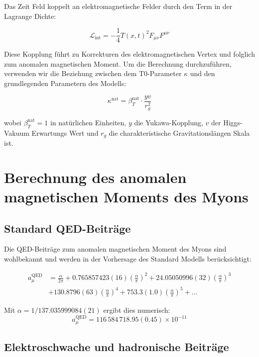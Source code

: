 \documentclass[12pt,a4paper]{article}
\begin{document}
	Das Zeit Feld koppelt an elektromagnetische Felder durch den Term in der Lagrange Dichte:
	
	\begin{equation}
		\mathcal{L}_{\text{int}} = -\frac{1}{4}T(x,t)^2 F_{\mu\nu}F^{\mu\nu}
	\end{equation}
	
	Diese Kopplung führt zu Korrekturen des elektromagnetischen Vertex und folglich zum anomalen magnetischen Moment. Um die Berechnung durchzuführen, verwenden wir die Beziehung zwischen dem T0-Parameter $\kappa$ und den grundlegenden Parametern des Modells:
	
	\begin{equation}
		\kappa^{\text{nat}} = \beta_T^{\text{nat}} \cdot \frac{yv}{r_g^2}
	\end{equation}
	
	wobei $\beta_T^{\text{nat}} = 1$ in natürlichen Einheiten, $y$ die Yukawa-Kopplung, $v$ der Higgs-Vakuum Erwartungs Wert und $r_g$ die charakteristische Gravitationslängen Skala ist.
	
	\section{Berechnung des anomalen magnetischen Moments des Myons}
	
	\subsection{Standard QED-Beiträge}
	
	Die QED-Beiträge zum anomalen magnetischen Moment des Myons sind wohlbekannt und werden in der Vorhersage des Standard Modells berücksichtigt:
	
	\begin{align}
		a_\mu^{\text{QED}} &= \frac{\alpha}{2\pi} + 0.765857423(16) \left(\frac{\alpha}{\pi}\right)^2 + 24.05050996(32) \left(\frac{\alpha}{\pi}\right)^3 \nonumber\\
		&+ 130.8796(63) \left(\frac{\alpha}{\pi}\right)^4 + 753.3(1.0) \left(\frac{\alpha}{\pi}\right)^5 + \ldots
	\end{align}
	
	Mit $\alpha = 1/137.035999084(21)$ ergibt dies numerisch:
	\begin{equation}
		a_\mu^{\text{QED}} = 116\,584\,718.95(0.45) \times 10^{-11}
	\end{equation}
	
	\subsection{Elektroschwache und hadronische Beiträge}
	
\end{document}
